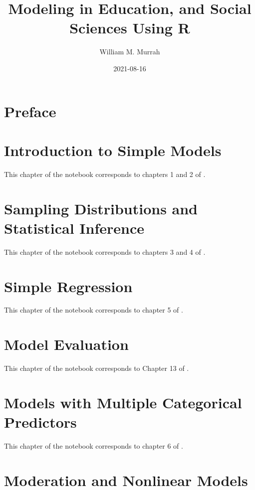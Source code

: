\documentclass[
]{book}
\title{Modeling in Education, and Social Sciences Using R}
\author{William M. Murrah}
\date{2021-08-16}
\begin{document}
\maketitle

{
\setcounter{tocdepth}{1}
\tableofcontents
}
\hypertarget{preface}{%
\chapter*{Preface}\label{preface}}

\hypertarget{intro}{%
\chapter{Introduction to Simple Models}\label{intro}}

This chapter of the notebook corresponds to chapters 1 and 2 of \citet{judd2017data}.

\hypertarget{sampdist}{%
\chapter{Sampling Distributions and Statistical Inference}\label{sampdist}}

This chapter of the notebook corresponds to chapters 3 and 4 of \citet{judd2017data}.

\hypertarget{simple}{%
\chapter{Simple Regression}\label{simple}}

This chapter of the notebook corresponds to chapter 5 of \citet{judd2017data}.

\hypertarget{modeleval}{%
\chapter{Model Evaluation}\label{modeleval}}

This chapter of the notebook corresponds to Chapter 13 of \citet{judd2017data}.

\hypertarget{multiple}{%
\chapter{Models with Multiple Categorical Predictors}\label{multiple}}

This chapter of the notebook corresponds to chapter 6 of \citet{judd2017data}.

\hypertarget{Interaction}{%
\chapter{Moderation and Nonlinear Models}\label{Interaction}}
\end{document}
